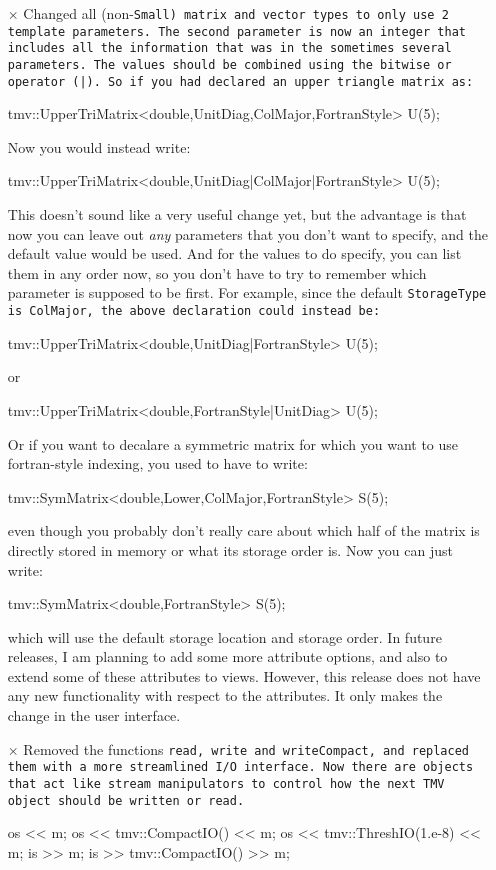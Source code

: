 \begin{itemize}
\item[$\times$]
Changed all (non-\tt{Small}) matrix and vector types to only use 2 template
parameters.  The second parameter is now an integer that includes all
the information that was in the sometimes several parameters.  The 
values should be combined using the bitwise or operator (\tt{|}).  
So if you had declared an upper triangle matrix as:
\begin{tmvcode}
tmv::UpperTriMatrix<double,UnitDiag,ColMajor,FortranStyle> U(5);
\end{tmvcode}
Now you would instead write:
\begin{tmvcode}
tmv::UpperTriMatrix<double,UnitDiag|ColMajor|FortranStyle> U(5);
\end{tmvcode}
This doesn't sound like a very useful change yet, but the advantage is that
now you can leave out {\em any} parameters that you don't want to specify,
and the default value would be used.  And for the values to do specify, you can list them in any order now,
so you don't have to try to remember which parameter is supposed to be first.  For example, since the default 
\tt{StorageType} is \tt{ColMajor}, the above declaration could instead be:
\begin{tmvcode}
tmv::UpperTriMatrix<double,UnitDiag|FortranStyle> U(5);
\end{tmvcode}
or
\begin{tmvcode}
tmv::UpperTriMatrix<double,FortranStyle|UnitDiag> U(5);
\end{tmvcode}
Or if you want to decalare a symmetric matrix for which you want to
use fortran-style indexing, you used to have to write:
\begin{tmvcode}
tmv::SymMatrix<double,Lower,ColMajor,FortranStyle> S(5);
\end{tmvcode}
even though you probably don't really care about which half of the 
matrix is directly stored in memory or what its storage order is.
Now you can just write:
\begin{tmvcode}
tmv::SymMatrix<double,FortranStyle> S(5);
\end{tmvcode}
which will use the default storage location and storage order.
In future releases, I am planning to add some more attribute options,
and also to extend some of these attributes to views.  However,
this release does not have any new functionality with respect to the
attributes.  It only makes the change in the user interface.
 
\item[$\times$]
Removed the functions \tt{read}, \tt{write} and \tt{writeCompact}, and replaced them with a more streamlined I/O interface. Now there are objects that act like stream manipulators to control how the next TMV object should be written or read.
\begin{tmvcode}
os << m;  
os << tmv::CompactIO() << m;
os << tmv::ThreshIO(1.e-8) << m;
is >> m;
is >> tmv::CompactIO() >> m;
\end{tmvcode}


\end{itemize}
